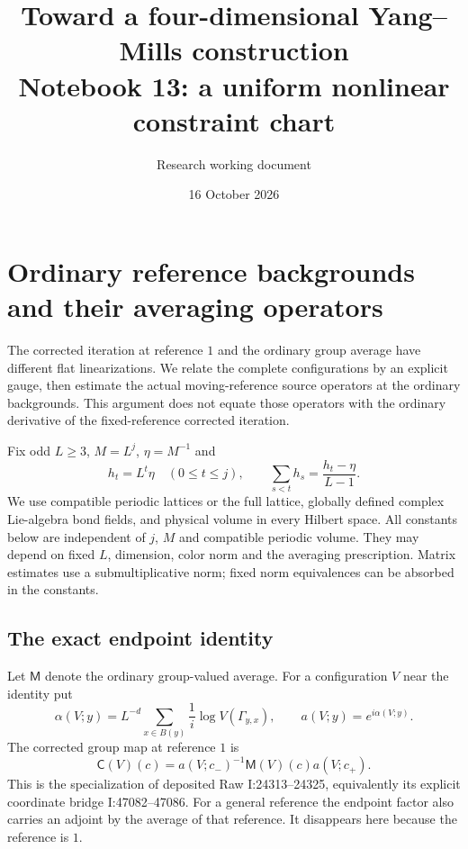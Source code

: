 \documentclass[11pt]{article}
\title{Toward a four-dimensional Yang--Mills construction\\
\large Notebook 13: a uniform nonlinear constraint chart}
\author{Research working document}
\date{16 October 2026}
\theoremstyle{remark}
\newcommand{\norm}[1]{\left\|#1\right\|}
\begin{document}

\section{Ordinary reference backgrounds and their averaging operators}
\label{nb-section}

The corrected iteration at reference $1$ and the ordinary group
average have different flat linearizations. We relate the complete
configurations by an explicit gauge, then estimate the actual
moving-reference source operators at the ordinary backgrounds.
This argument does not equate those operators with the ordinary
derivative of the fixed-reference corrected iteration.

Fix odd $L\ge3$, $M=L^j$, $\eta=M^{-1}$ and
\begin{equation}\label{nb-scales}
 h_t=L^t\eta\quad(0\le t\le j),\qquad
 \sum_{s<t}h_s=\frac{h_t-\eta}{L-1}.
\end{equation}
We use compatible periodic lattices or the full lattice, globally
defined complex Lie-algebra bond fields, and physical volume in
every Hilbert space. All constants below are independent of $j$,
$M$ and compatible periodic volume. They may depend on fixed
$L$, dimension, color norm and the averaging prescription.
Matrix estimates use a submultiplicative norm; fixed norm
equivalences can be absorbed in the constants.

\subsection{The exact endpoint identity}
\label{nb-source}

Let $\mathsf M$ denote the ordinary group-valued average. For a
configuration $V$ near the identity put
\begin{equation}\label{nb-endpoint-map}
 \alpha(V;y)=L^{-d}\sum_{x\in B(y)}\frac1i
                      \log V(\Gamma_{y,x}),\qquad
 a(V;y)=e^{i\alpha(V;y)}.
\end{equation}
The corrected group map at reference $1$ is
\begin{equation}\label{nb-corrected-map}
 \mathsf C(V)(c)
   =a(V;c_-)^{-1}\mathsf M(V)(c)a(V;c_+).
\end{equation}
This is the specialization of deposited Raw I:24313--24325,
equivalently its explicit coordinate bridge I:47082--47086.
For a general reference the endpoint factor also carries an
adjoint by the average of that reference. It disappears here
because the reference is $1$.
\end{document}
